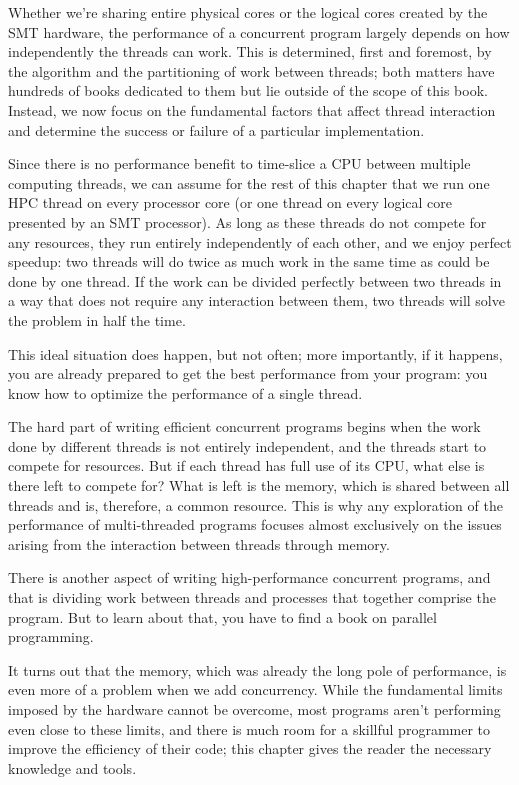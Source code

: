 Whether we're sharing entire physical cores or the logical cores created by the SMT hardware, the performance of a concurrent program largely depends on how independently the threads can work. This is determined, first and foremost, by the algorithm and the partitioning of work between threads; both matters have hundreds of books dedicated to them but lie outside of the scope of this book. Instead, we now focus on the fundamental factors that affect thread interaction and determine the success or failure of a particular implementation.


Since there is no performance benefit to time-slice a CPU between multiple computing threads, we can assume for the rest of this chapter that we run one HPC thread on every processor core (or one thread on every logical core presented by an SMT processor). As long as these threads do not compete for any resources, they run entirely independently of each other, and we enjoy perfect speedup: two threads will do twice as much work in the same time as could be done by one thread. If the work can be divided perfectly between two threads in a way that does not require any interaction between them, two threads will solve the problem in half the time.

This ideal situation does happen, but not often; more importantly, if it happens, you are already prepared to get the best performance from your program: you know how to optimize the performance of a single thread.

The hard part of writing efficient concurrent programs begins when the work done by different threads is not entirely independent, and the threads start to compete for resources. But if each thread has full use of its CPU, what else is there left to compete for? What is left is the memory, which is shared between all threads and is, therefore, a common resource. This is why any exploration of the performance of multi-threaded programs focuses almost exclusively on the issues arising from the interaction between threads through memory.

There is another aspect of writing high-performance concurrent programs, and that is dividing work between threads and processes that together comprise the program. But to learn about that, you have to find a book on parallel programming. 

It turns out that the memory, which was already the long pole of performance, is even more of a problem when we add concurrency. While the fundamental limits imposed by the hardware cannot be overcome, most programs aren't performing even close to these limits, and there is much room for a skillful programmer to improve the efficiency of their code; this chapter gives the reader the necessary knowledge and tools.

